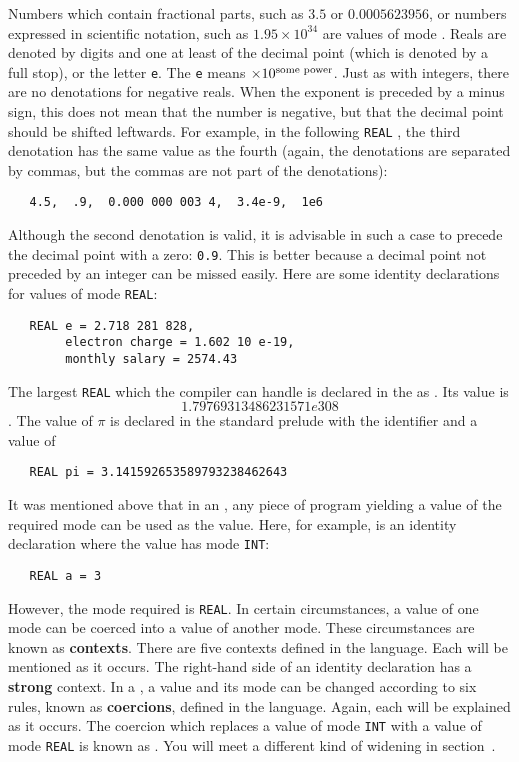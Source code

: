 Numbers which contain fractional parts, such as $3.5$ or\newline
$0.0005623956$, or numbers expressed in scientific notation, such as
$1.95\times10^{34}$ are values of mode .  Reals are
denoted by digits and one at least of the decimal point (which is
denoted by a full stop), or the letter \verb|e|.  The \verb|e| means
$\times10^{\hbox{\scriptsize some power}}$.  Just as with integers,
there are no denotations for negative reals.  When the exponent is
preceded by a minus sign, this does not mean that the number is
negative, but that the decimal point should be shifted leftwards.
For example, in the following \verb|REAL|
, the third denotation has the
same value as the fourth (again, the denotations are separated by
commas, but the commas are not part of the denotations):
\begin{verbatim}
   4.5,  .9,  0.000 000 003 4,  3.4e-9,  1e6
\end{verbatim}
\noindent
Although the second denotation is valid, it is advisable in such a
case to precede the decimal point with a zero: \verb|0.9|.  This is
better because a decimal point not preceded by an integer can be
missed easily.  Here are some identity declarations for values of
mode \verb|REAL|:
\begin{verbatim}
   REAL e = 2.718 281 828,
        electron charge = 1.602 10 e-19,
        monthly salary = 2574.43
\end{verbatim}
\noindent
The largest \verb|REAL| which the compiler can handle is declared in
the  as . Its value is
$$1.79769313486231571e308$$. The value of $\pi$ is declared in the
standard prelude with the identifier  and a value of
\begin{verbatim}
   REAL pi = 3.141592653589793238462643
\end{verbatim}

It was mentioned above that in an
, any piece of
program yielding a value of the required mode can be used as the
value. Here, for example, is an identity declaration where the value
has mode \verb|INT|:
\begin{verbatim}
   REAL a = 3
\end{verbatim}
\noindent
However, the mode required is \verb|REAL|. In certain circumstances,
a value of one mode can be coerced into a value of another mode.
These circumstances are known as \textbf{contexts}.  There are five
contexts defined in the language.  Each  will be
mentioned as it occurs.  The right-hand side of an identity
declaration has a \textbf{strong} context.  In a
, a value and its mode can be
changed according to six rules, known as \textbf{coercions}, defined
in the language.  Again, each  will be explained as it
occurs.  The coercion which replaces a value of mode \verb|INT| with
a value of mode \verb|REAL| is known as
.  You will
meet a different kind of widening in section~.

